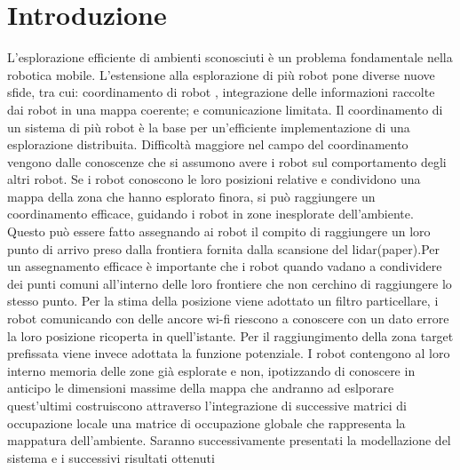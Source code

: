 \section{Introduzione}
L'esplorazione efficiente di ambienti sconosciuti è un problema fondamentale nella robotica mobile. 
L'estensione alla esplorazione di più robot pone diverse nuove sfide, tra cui: coordinamento di robot , integrazione delle informazioni raccolte dai robot in una mappa coerente; e comunicazione limitata.
Il coordinamento di un sistema di più robot è la base per un'efficiente implementazione di una esplorazione distribuita. Difficoltà maggiore nel campo del coordinamento vengono dalle conoscenze che si assumono avere i robot sul comportamento degli altri robot. Se i robot conoscono le loro posizioni relative e condividono una mappa della zona che hanno esplorato finora, si può raggiungere un coordinamento efficace, guidando i robot in zone inesplorate dell'ambiente.
Questo può essere fatto assegnando ai robot il compito di raggiungere un loro punto di arrivo preso dalla frontiera fornita dalla scansione del lidar(paper).Per un assegnamento efficace è importante che i robot quando vadano a condividere dei punti comuni all'interno delle loro frontiere che non cerchino di raggiungere lo stesso punto.
Per la stima della posizione viene adottato un filtro particellare, i robot comunicando con delle ancore wi-fi riescono a conoscere con un dato errore la loro posizione ricoperta in quell'istante. Per il raggiungimento della zona target prefissata viene invece adottata la funzione potenziale.
I robot contengono al loro interno memoria delle zone già esplorate e non, ipotizzando di conoscere in anticipo le dimensioni massime della mappa che andranno ad eslporare quest'ultimi costruiscono attraverso l'integrazione di successive matrici di occupazione locale una matrice di occupazione globale che rappresenta la mappatura dell'ambiente.
Saranno successivamente presentati la modellazione del sistema e i successivi risultati ottenuti

